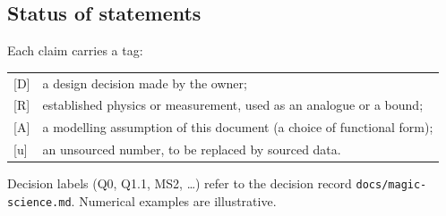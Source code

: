 \documentclass[11pt,a4paper]{article}
\numberwithin{equation}{section}
\theoremstyle{definition}
\theoremstyle{plain}
\theoremstyle{remark}
\newcommand{\tagD}{\textcolor{tag}{\textsf{[D]}}}
\newcommand{\tagR}{\textcolor{tag}{\textsf{[R]}}}
\newcommand{\tagA}{\textcolor{tag}{\textsf{[A]}}}
\newcommand{\tagU}{\textcolor{tag}{\textsf{[u]}}}
\begin{document}
\subsection{Status of statements}
Each claim carries a tag:
\begin{center}
\begin{tabular}{@{}ll@{}}
\tagD & a design decision made by the owner;\\
\tagR & established physics or measurement, used as an analogue or a bound;\\
\tagA & a modelling assumption of this document (a choice of functional form);\\
\tagU & an unsourced number, to be replaced by sourced data.
\end{tabular}
\end{center}
Decision labels (Q0, Q1.1, MS2, \dots) refer to the decision record \texttt{docs/magic-science.md}. Numerical examples are illustrative.
\end{document}
